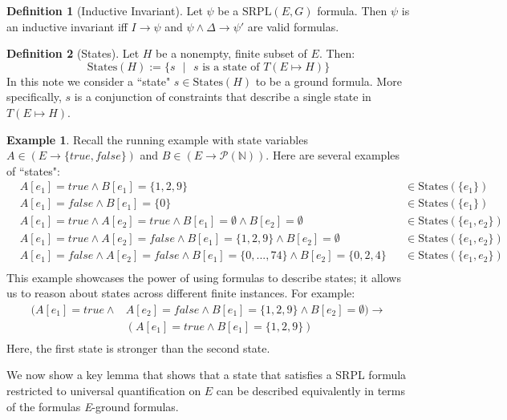 \documentclass[12pt]{article}
\theoremstyle{definition}
\newtheorem{definition}{Definition}
\newtheorem{example}{Example}
\theoremstyle{remark}
\newcommand{\st}{\text{ }|\text{ }}
\newcommand{\states}{\text{States}}
\newcommand{\SRPL}{\text{SRPL}}
\begin{document}
\begin{definition}[Inductive Invariant]
  Let $\psi$ be a $\SRPL(E,G)$ formula.  Then $\psi$ is an inductive invariant iff $I \rightarrow \psi$ and $\psi \land \Delta \rightarrow \psi'$ are valid formulas.
\end{definition}

\begin{definition}[States]
  Let $H$ be a nonempty, finite subset of $E$.  Then:
  $$\states(H) := \{s \st s \text{ is a state of } T(E \mapsto H)\}$$
  In this note we consider a ``state" $s \in \states(H)$ to be a ground formula.  More specifically, $s$ is a conjunction of constraints that describe a single state in $T(E \mapsto H)$.
\end{definition}

\begin{example}
  Recall the running example with state variables $A \in (E \to \{true,false\})$ and $B \in (E \to \mathcal{P}(\mathbb{N}))$.  Here are several examples of ``states":
  \begin{align*}
    &A[e_1]=true \land B[e_1]=\{1,2,9\}& &\in \states(\{e_1\})\\
    &A[e_1]=false \land B[e_1]=\{0\}& &\in \states(\{e_1\})\\
    &A[e_1]=true \land A[e_2]=true \land B[e_1]=\emptyset \land B[e_2]=\emptyset& &\in \states(\{e_1,e_2\})\\
    &A[e_1]=true \land A[e_2]=false \land B[e_1]=\{1,2,9\} \land B[e_2]=\emptyset& &\in \states(\{e_1,e_2\})\\
    &A[e_1]=false \land A[e_2]=false \land B[e_1]=\{0,...,74\} \land B[e_2]=\{0,2,4\}& &\in \states(\{e_1,e_2\})\\
  \end{align*}
  This example showcases the power of using formulas to describe states; it allows us to reason about states across different finite instances.  For example:
  \begin{align*}
    (A[e_1]=true \land& A[e_2]=false \land B[e_1]=\{1,2,9\} \land B[e_2]=\emptyset) \rightarrow\\
    &(A[e_1]=true \land B[e_1]=\{1,2,9\})\\
  \end{align*}
  Here, the first state is stronger than the second state.
\end{example}

We now show a key lemma that shows that a state that satisfies a SRPL formula restricted to universal quantification on $E$ can be described equivalently in terms of the formulas \textit{E}-ground formulas.
\end{document}
